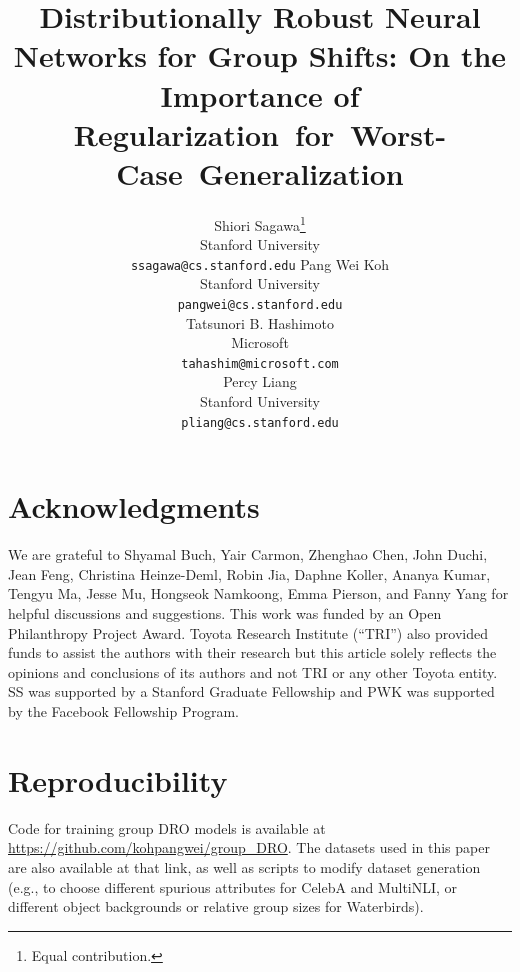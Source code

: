 \documentclass{article} %
\title{Distributionally Robust Neural Networks for Group Shifts: On the Importance of\\
\mbox{Regularization for Worst-Case Generalization}}
\author{Shiori Sagawa\thanks{Equal contribution.}\\
Stanford University\\\texttt{ssagawa@cs.stanford.edu}\And
Pang Wei Koh\footnotemark[1]\\Stanford University\\\texttt{pangwei@cs.stanford.edu}\mbox{\hspace{17.12mm}}\\\AND
Tatsunori B. Hashimoto\\Microsoft\\\texttt{tahashim@microsoft.com}\\\And
Percy Liang\\Stanford University\\\texttt{pliang@cs.stanford.edu}}
\begin{document}
\maketitle
\vspace{-3mm}

\begin{abstract}
  
\end{abstract}
\vspace{-2mm}











\newpage
\section*{Acknowledgments}
We are grateful to
Shyamal Buch,
Yair Carmon,
Zhenghao Chen,
John Duchi,
Jean Feng,
Christina Heinze-Deml,
Robin Jia,
Daphne Koller,
Ananya Kumar,
Tengyu Ma,
Jesse Mu,
Hongseok Namkoong,
Emma Pierson,
and Fanny Yang
for helpful discussions and suggestions.
This work was funded by an Open Philanthropy Project Award.
Toyota Research Institute (``TRI'') also provided funds to assist the authors with their research but this article solely reflects the opinions and conclusions of its authors and not TRI or any other Toyota entity.
SS was supported by a Stanford Graduate Fellowship and PWK was supported by the Facebook Fellowship Program.

\section*{Reproducibility}
Code for training group DRO models is available at \url{https://github.com/kohpangwei/group_DRO}.
The datasets used in this paper are also available at that link, as well as scripts to modify dataset generation (e.g., to choose different spurious attributes for CelebA and MultiNLI, or different object backgrounds or relative group sizes for Waterbirds).




\appendix



\end{document}

